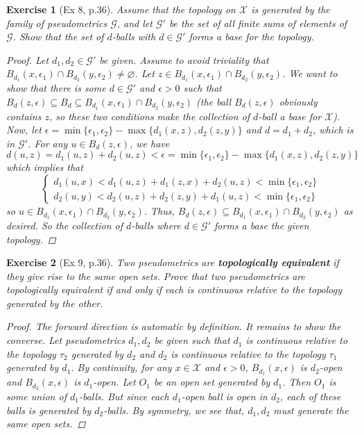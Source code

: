 \documentclass[11pt]{article}
\newtheorem{exercise}{Exercise}
\newcommand{\X}{\mathcal{X}}
\begin{document}
\begin{exercise}[Ex 8, p.36]
	Assume that the topology on $\X$ is generated by the family of pseudometrics $\mathcal{G}$, and let $\mathcal{G}'$ be the set of all finite sums of elements of $\mathcal{G}$. Show that the set
	of $d$-balls with $d \in \mathcal{G}'$ forms a base for the topology.
	\begin{proof}
		Let $d_1, d_2\in \mathcal{G'}$ be given. Assume to avoid triviality that $B_{d_1}(x,\epsilon_1)\cap B_{d_2}(y,\epsilon_2) \neq \varnothing$. Let $z\in B_{d_1}(x,\epsilon_1)\cap B_{d_2}(y,\epsilon_2)$. We want to show that there is some $d\in \mathcal{G'}$ and $\epsilon > 0$ such that $B_d(z,\epsilon)\subseteq B_d \subseteq B_{d_1}(x,\epsilon_1) \cap B_{d_2}(y,\epsilon_2)$ (the ball $B_d(z,\epsilon)$ obviously contains $z$, so these two conditions make the collection of $d$-ball a base for $\X$). Now, let $\epsilon = \min\{\epsilon_1,\epsilon_2\} - \max\{d_1(x,z), d_2(z,y)\}$ and $d = d_1 + d_2$, which is in $\mathcal{G}'$. For any $u\in B_d(z,\epsilon)$, we have
		\begin{equation*}
		d(u,z) = d_1(u,z) + d_2(u,z) < \epsilon = \min\{\epsilon_1,\epsilon_2\} - \max\{d_1(x,z), d_2(z,y)\} 
		\end{equation*}
		which implies that
		\begin{equation*}
		\begin{cases}
		d_1(u,x) < d_1(u,z) + d_1(z,x) + d_2(u,z) < \min\{\epsilon_1,\epsilon_2\}    \\
		d_2(u,y) < d_2(u,z) + d_2(z,y) + d_1(u,z) < \min\{\epsilon_1,\epsilon_2\} 
		\end{cases}
		\end{equation*}
		so $u\in B_{d_1}(x,\epsilon_1) \cap B_{d_2}(y,\epsilon_2) $. Thus, $B_d(z,\epsilon) \subseteq B_{d_1}(x,\epsilon_1) \cap B_{d_2}(y,\epsilon_2)$ as desired. So the collection of $d$-balls where $d\in \mathcal{G}'$ forms a base the given topology.
	\end{proof}
\end{exercise}



\begin{exercise}[Ex 9, p.36]
	Two pseudometrics are \textbf{topologically equivalent} if they give rise to the same open sets. Prove that two pseudometrics are topologically equivalent if and only if each is continuous relative to the topology generated by the other.
	\begin{proof}
		The forward direction is automatic by definition. It remains to show the converse. Let pseudometrics $d_1,d_2$ be given such that $d_1$ is continuous relative to the topology $\tau_2$ generated by $d_2$ and $d_2$ is continuous relative to the topology $\tau_1$ generated by $d_1$. By continuity, for any $x\in \X$ and  $\epsilon>0$,  $B_{d_1}(x,\epsilon)$ is $d_2$-open and $B_{d_2}(x,\epsilon)$ is $d_1$-open. Let $O_1$ be an open set generated by $d_1$. Then $O_1$ is some union of $d_1$-balls. But since each $d_1$-open ball is open in $d_2$, each of these balls is generated by $d_2$-balls. By symmetry, we see that, $d_1,d_2$ must generate the same open sets. 
	\end{proof}
\end{exercise}
\end{document}
